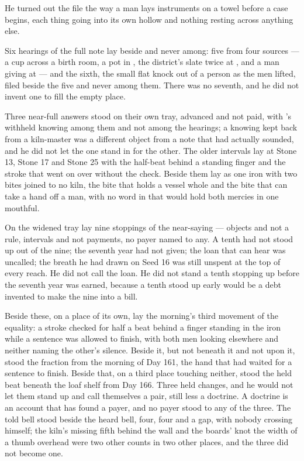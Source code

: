\scenebreak

He turned out the file the way a man lays instruments on a towel before a case begins, each thing going into its own hollow and nothing resting across anything else.

Six hearings of the full note lay beside and never among: five from four sources --- a cup across a birth room, a pot in , the district's slate twice at , and a man giving at  --- and the sixth, the small flat knock out of a person as the men lifted, filed beside the five and never among them. There was no seventh, and he did not invent one to fill the empty place.

Three near-full answers stood on their own tray, advanced and not paid, with 's withheld knowing among them and not among the hearings; a knowing kept back from a kiln-master was a different object from a note that had actually sounded, and he did not let the one stand in for the other. The older intervals lay at Stone 13, Stone 17 and Stone 25 with the half-beat behind a standing finger and the stroke that went on over  without the check. Beside them  lay as one iron with two bites joined to no kiln, the bite that holds a vessel whole and the bite that can take a hand off a man, with no word in  that would hold both mercies in one mouthful.

On the widened tray lay nine stoppings of the near-saying --- objects and not a rule, intervals and not payments, no payer named to any. A tenth had not stood up out of the nine; the seventh year had not given; the loan that can hear was uncalled; the breath he had drawn on Seed 16 was still unspent at the top of every reach. He did not call the loan. He did not stand a tenth stopping up before the seventh year was earned, because a tenth stood up early would be a debt invented to make the nine into a bill.

Beside these, on a place of its own, lay the morning's third movement of the equality: a stroke checked for half a beat behind a finger standing in the iron while a sentence was allowed to finish, with both men looking elsewhere and neither naming the other's silence. Beside it, but not beneath it and not upon it, stood the fraction from the morning of Day 161, the hand that had waited for a sentence to finish. Beside that, on a third place touching neither, stood the held beat beneath the loaf shelf from Day 166. Three held changes, and he would not let them stand up and call themselves a pair, still less a doctrine. A doctrine is an account that has found a payer, and no payer stood to any of the three. The told bell stood beside the heard bell, four, four and a gap, with nobody crossing himself; the kiln's missing fifth behind the wall and the boards' knot the width of a thumb overhead were two other counts in two other places, and the three did not become one.

